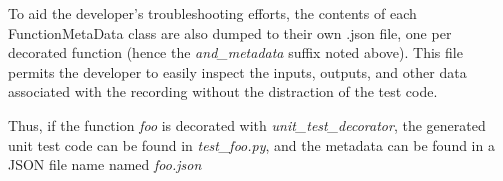 To aid the developer's troubleshooting efforts, the contents of each FunctionMetaData
class are also dumped to their own .json file, one per decorated function (hence
the \textit{and\_metadata} suffix noted above).  This file permits the 
developer to easily inspect the inputs, outputs, and other data
associated with the recording without the distraction of the test code.

Thus, if the function \textit{foo} is decorated with \textit{unit\_test\_decorator},
the generated unit test code can be found in \textit{test\_foo.py}, and the 
metadata can be found in a JSON file name named \textit{foo.json}


